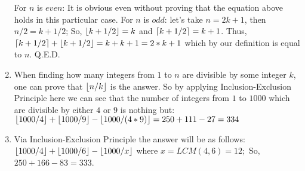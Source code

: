 \documentclass[12pt]{article}
\DeclarePairedDelimiter{\ceil}{\lceil}{\rceil}
\DeclarePairedDelimiter{\floor}{\lfloor}{\rfloor}
\begin{document}
\begin{enumerate}
    For $n$ is $even$: It is obvious even without proving that the equation above holds in this particular case. \newline
    For $n$ is $odd$: let's take $n = 2k + 1$, then $n/2 = k + 1/2$; \newline
    So, $\floor{k + 1/2} = k$ and $\ceil{k + 1/2} = k + 1$. \newline
    Thus, $\ceil{k + 1/2} + \floor{k + 1/2} = k + k + 1 = 2*k + 1$ which by our definition is equal to $n$. \newline Q.E.D.
  \item
    When finding how many integers from $1$ to $n$ are divisible by some integer $k$, one can prove that $\floor{n/k}$ is the answer. \newline \newline
    So by applying Inclusion-Exclusion Principle here we can see that the number of integers from $1$ to $1000$ which are divisible by either $4$ or $9$ is nothing but: \newline
    $\floor{1000/4} + \floor{1000/9} - \floor{1000/(4*9)} = 250 + 111 - 27 = 334$
  \item
    Via Inclusion-Exclusion Principle the answer will be as follows: \newline
    $\floor{1000/4} + \floor{1000/6} - \floor{1000/x}$ where $x = LCM(4, 6) = 12;$ \newline
    So, $250 + 166 - 83 = 333$.
\end{enumerate}
\end{document}
